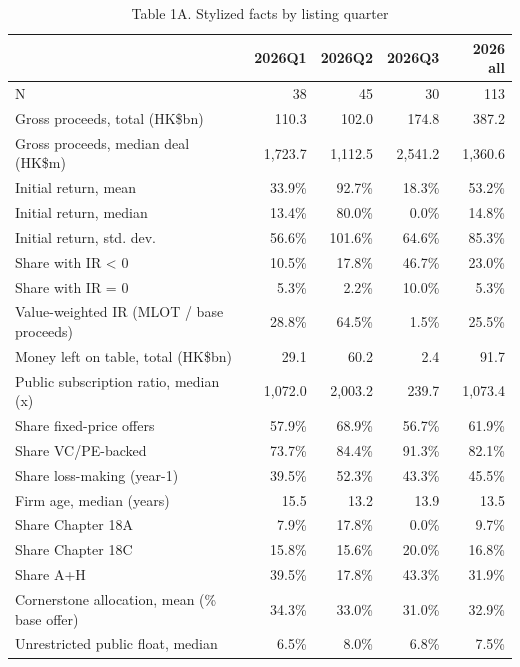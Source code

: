 \begin{table}[htbp]\centering\small
\caption{Table 1A. Stylized facts by listing quarter}
\begin{tabular}{lrrrr}
\hline
 & 2026Q1 & 2026Q2 & 2026Q3 & 2026 all \\
\hline
N & 38 & 45 & 30 & 113 \\
Gross proceeds, total (HK\$bn) & 110.3 & 102.0 & 174.8 & 387.2 \\
Gross proceeds, median deal (HK\$m) & 1,723.7 & 1,112.5 & 2,541.2 & 1,360.6 \\
Initial return, mean & 33.9\% & 92.7\% & 18.3\% & 53.2\% \\
Initial return, median & 13.4\% & 80.0\% & 0.0\% & 14.8\% \\
Initial return, std. dev. & 56.6\% & 101.6\% & 64.6\% & 85.3\% \\
Share with IR < 0 & 10.5\% & 17.8\% & 46.7\% & 23.0\% \\
Share with IR = 0 & 5.3\% & 2.2\% & 10.0\% & 5.3\% \\
Value-weighted IR (MLOT / base proceeds) & 28.8\% & 64.5\% & 1.5\% & 25.5\% \\
Money left on table, total (HK\$bn) & 29.1 & 60.2 & 2.4 & 91.7 \\
Public subscription ratio, median (x) & 1,072.0 & 2,003.2 & 239.7 & 1,073.4 \\
Share fixed-price offers & 57.9\% & 68.9\% & 56.7\% & 61.9\% \\
Share VC/PE-backed & 73.7\% & 84.4\% & 91.3\% & 82.1\% \\
Share loss-making (year-1) & 39.5\% & 52.3\% & 43.3\% & 45.5\% \\
Firm age, median (years) & 15.5 & 13.2 & 13.9 & 13.5 \\
Share Chapter 18A & 7.9\% & 17.8\% & 0.0\% & 9.7\% \\
Share Chapter 18C & 15.8\% & 15.6\% & 20.0\% & 16.8\% \\
Share A+H & 39.5\% & 17.8\% & 43.3\% & 31.9\% \\
Cornerstone allocation, mean (\% base offer) & 34.3\% & 33.0\% & 31.0\% & 32.9\% \\
Unrestricted public float, median & 6.5\% & 8.0\% & 6.8\% & 7.5\% \\
\hline
\end{tabular}
\end{table}

